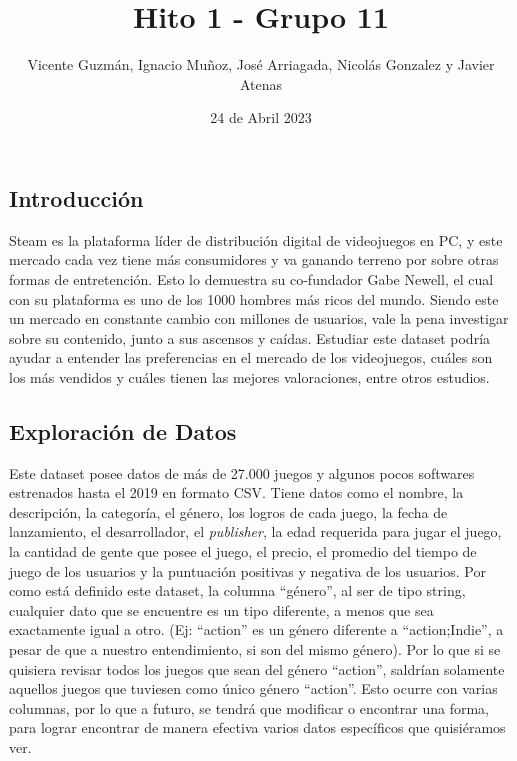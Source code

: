 \documentclass[
]{article}
\title{Hito 1 - Grupo 11}
\author{Vicente Guzmán, Ignacio Muñoz, José Arriagada, Nicolás Gonzalez
y Javier Atenas}
\date{24 de Abril 2023}
\begin{document}
\maketitle

{
\setcounter{tocdepth}{2}
\tableofcontents
}
\hfill\break

\hypertarget{introducciuxf3n}{%
\subsection{Introducción}\label{introducciuxf3n}}

Steam es la plataforma líder de distribución digital de videojuegos en
PC, y este mercado cada vez tiene más consumidores y va ganando terreno
por sobre otras formas de entretención. Esto lo demuestra su co-fundador
Gabe Newell, el cual con su plataforma es uno de los 1000 hombres más
ricos del mundo. Siendo este un mercado en constante cambio con millones
de usuarios, vale la pena investigar sobre su contenido, junto a sus
ascensos y caídas. Estudiar este dataset podría ayudar a entender las
preferencias en el mercado de los videojuegos, cuáles son los más
vendidos y cuáles tienen las mejores valoraciones, entre otros
estudios.\\

\hypertarget{exploraciuxf3n-de-datos}{%
\subsection{Exploración de Datos}\label{exploraciuxf3n-de-datos}}

Este dataset posee datos de más de 27.000 juegos y algunos pocos
softwares estrenados hasta el 2019 en formato CSV. Tiene datos como el
nombre, la descripción, la categoría, el género, los logros de cada
juego, la fecha de lanzamiento, el desarrollador, el \emph{publisher},
la edad requerida para jugar el juego, la cantidad de gente que posee el
juego, el precio, el promedio del tiempo de juego de los usuarios y la
puntuación positivas y negativa de los usuarios. Por como está definido
este dataset, la columna ``género'', al ser de tipo string, cualquier
dato que se encuentre es un tipo diferente, a menos que sea exactamente
igual a otro. (Ej: ``action'' es un género diferente a ``action;Indie'',
a pesar de que a nuestro entendimiento, si son del mismo género). Por lo
que si se quisiera revisar todos los juegos que sean del género
``action'', saldrían solamente aquellos juegos que tuviesen como único
género ``action''. Esto ocurre con varias columnas, por lo que a futuro,
se tendrá que modificar o encontrar una forma, para lograr encontrar de
manera efectiva varios datos específicos que quisiéramos ver.\\
\end{document}
